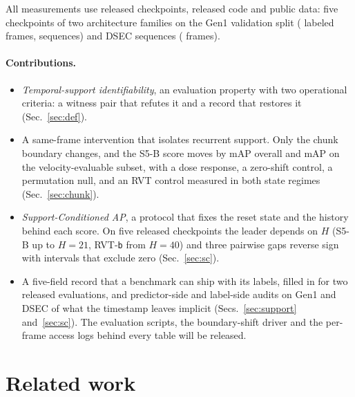 \documentclass[10pt,twocolumn,letterpaper]{article}
\begin{document}
All measurements use released checkpoints, released code and public data: five checkpoints of two architecture families on the Gen1 validation split (\fhNAll{} labeled frames, \outSeqsScanned{} sequences) and \dsecSeqCount{} DSEC sequences (\dsecFrameCount{} frames).

\paragraph{Contributions.}
\begin{itemize}
\setlength{\itemsep}{0pt}\setlength{\parskip}{0pt}\setlength{\topsep}{2pt}
\item \emph{Temporal-support identifiability}, an evaluation property with two operational criteria: a witness pair that refutes it and a record that restores it (Sec.~\ref{sec:def}).
\item A same-frame intervention that isolates recurrent support. Only the chunk boundary changes, and the S5-B score moves by \ssmPairedMapAllBase{} mAP overall and \ssmPairedMapVelBase{} mAP on the velocity-evaluable subset, with a dose response, a zero-shift control, a permutation null, and an RVT control measured in both state regimes (Sec.~\ref{sec:chunk}).
\item \emph{Support-Conditioned AP}, a protocol that fixes the reset state and the history behind each score. On five released checkpoints the leader depends on $H$ (S5-B up to $H=21$, RVT-\texttt{b} from $H=40$) and three pairwise gaps reverse sign with intervals that exclude zero (Sec.~\ref{sec:sc}).
\item A five-field record that a benchmark can ship with its labels, filled in for two released evaluations, and predictor-side and label-side audits on Gen1 and DSEC of what the timestamp leaves implicit (Secs.~\ref{sec:support} and~\ref{sec:sc}). The evaluation scripts, the boundary-shift driver and the per-frame access logs behind every table will be released.
\end{itemize}

\section{Related work}
\label{sec:related}
\end{document}
